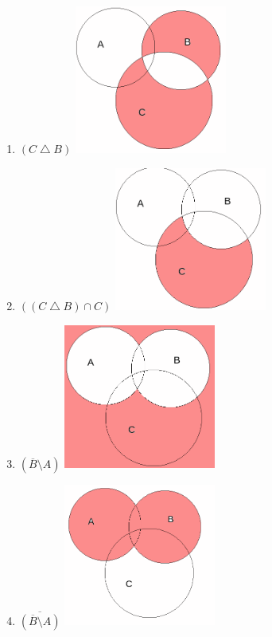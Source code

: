 \documentclass{article}
\begin{document}
\begin{enumerate}
    \item $(C \bigtriangleup B)$
    \includegraphics[width=50mm]{16.png}
    
    \item $((C \bigtriangleup B) \cap C)$
    \includegraphics[width=50mm]{17.png}
    
    \item $(\overline{B} \setminus A)$
    \includegraphics[width=50mm]{18.png}
    
    \item $\overline{(\overline{B} \setminus A)}$
    \includegraphics[width=50mm]{19.png}
    

\end{enumerate}
\end{document}
